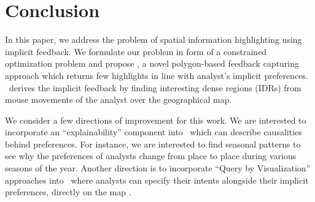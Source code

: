 \section{Conclusion}
\label{sec:conc}
In this paper, we address the problem of spatial information highlighting using implicit feedback. We formulate our problem in form of a constrained optimization problem and propose \sgg, a novel polygon-based feedback capturing approach which returns few highlights in line with analyst's implicit preferences. \sgg\ derives the implicit feedback by finding interesting dense regions (IDRs) from mouse movements of the analyst over the geographical map.

\vspace{2pt}
We consider a few directions of improvement for this work. We are interested to incorporate an ``explainability'' component into \sgg\ which can describe causalities behind preferences. For instance, we are interested to find seasonal patterns to see why the preferences of analysts change from place to place during various seasons of the year. Another direction is to incorporate ``Query by Visualization'' approaches into \sgg\ where analysts can specify their intents alongside their implicit preferences, directly on the map \cite{siddiqui2016effortless}.